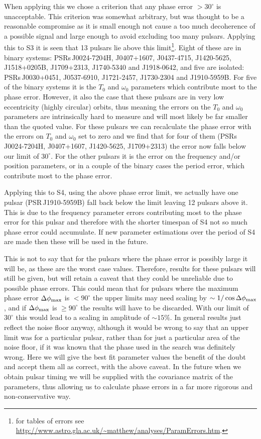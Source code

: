 When applying this we chose a criterion that any phase error $> 30^{\circ}$ is unacceptable. This
criterion was somewhat arbitrary, but was thought to be a reasonable compromise as it is small
enough not cause a too much decoherence of a possible signal and large enough to avoid excluding too
many pulsars. Applying this to S3 it is seen that 13 pulsars lie above this limit\footnote{for
tables of errors see \url{http://www.astro.gla.ac.uk/~matthew/analyses/ParamErrors.htm}.}. Eight of
these are in binary systems: PSRs\,J0024-7204H, J0407+1607, J0437-4715, J1420-5625, J1518+0205B,
J1709+2313, J1740-5340 and J1918-0642, and five are isolated: PSRs\,J0030+0451, J0537-6910,
J1721-2457, J1730-2304 and J1910-5959B. For five of the binary systems it is the $T_0$ and
$\omega_0$ parameters which contribute most to the phase error. However, it also the case that these
pulsars are in very low eccentricity (highly circular) orbits, thus meaning the errors on the $T_0$
and $\omega_0$ parameters are intrinsically hard to measure and will most likely be far smaller than
the quoted value. For these pulsars we can recalculate the phase error with the errors on $T_0$ and
$\omega_0$ set to zero and we find that for four of them (PSRs\,J0024-7204H, J0407+1607, J1420-5625,
J1709+2313) the error now falls below our limit of $30^{\circ}$. For the other pulsars it is the
error on the frequency and/or position parameters, or in a couple of the binary cases the period
error, which contribute most to the phase error.

Applying this to S4, using the above phase error limit, we actually have one pulsar
(PSR\,J1910-5959B) fall back below the limit leaving 12 pulsars above it. This is due to the
frequency parameter errors contributing most to the phase error for this pulsar and therefore with
the shorter timespan of S4 not so much phase error could accumulate. If new parameter estimations
over the period of S4 are made then these will be used in the future. 

This is not to say that for the pulsars where the phase error is possibly large it will be, as
these are the worst case values. Therefore, results for these pulsars will still be given, but will
retain a caveat that they could be unreliable due to possible phase errors. This could mean that
for pulsars where the maximum phase error $\Delta\phi_{\rm max}$ is $< 90^{\circ}$ the upper limits
may need scaling by $\sim 1/\cos{\Delta\phi_{\rm max}}$, and if $\Delta\phi_{\rm max}$ is $\ge
90^{\circ}$ the results will have to be discarded. With our limit of $30^{\circ}$ this would
lead to a scaling in amplitude of $\sim 15\%$. In general results just reflect the noise floor
anyway, although it would be wrong to say that an upper limit was for a particular pulsar, rather
than for just a particular area of the noise floor, if it was known that the phase used in the
search was definitely wrong. Here we will give the best fit parameter values the benefit of the
doubt and accept them all as correct, with the above caveat. In the future when we obtain pulsar
timing we will be supplied with the covariance matrix of the parameters, thus allowing us to
calculate phase errors in a far more rigorous and non-conservative way.

